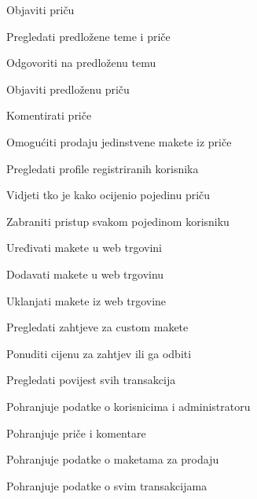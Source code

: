 \begin{packed_enum}
\begin{packed_enum}
				\end{packed_enum}
							\item  {}
			
				\begin{packed_enum}
					
					\item Objaviti priču
					\item Pregledati predložene teme i priče
					\item Odgovoriti na predloženu temu
					\item Objaviti predloženu priču
					\item Komentirati priče
					\item Omogućiti prodaju jedinstvene makete iz priče
					\item Pregledati profile registriranih korisnika
					\item Vidjeti tko je kako ocijenio pojedinu priču
					\item Zabraniti pristup svakom pojedinom korisniku
					\item Uređivati makete u web trgovini
					\item Dodavati makete u web trgovinu
					\item Uklanjati makete iz web trgovine
					\item Pregledati zahtjeve za custom makete
					\item Ponuditi cijenu za zahtjev ili ga odbiti
					\item Pregledati povijest svih transakcija
					
				\end{packed_enum}
							\item  {}
		
				\begin{packed_enum}
					
					\item Pohranjuje podatke o korisnicima i administratoru
					\item Pohranjuje priče i komentare
					\item Pohranjuje podatke o maketama za prodaju
					\item Pohranjuje podatke o svim transakcijama
					
				\end{packed_enum}
			\end{packed_enum}
			
			\eject 
			
			
				
